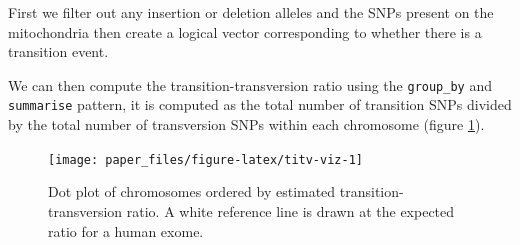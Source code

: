 \documentclass[10pt,letterpaper]{article}
\newenvironment{Shaded}{\begin{snugshade}}{\end{snugshade}}
\newcommand{\DataTypeTok}[1]{\textcolor[rgb]{0.13,0.29,0.53}{#1}}
\newcommand{\KeywordTok}[1]{\textcolor[rgb]{0.13,0.29,0.53}{\textbf{#1}}}
\newcommand{\NormalTok}[1]{#1}
\newcommand{\OperatorTok}[1]{\textcolor[rgb]{0.81,0.36,0.00}{\textbf{#1}}}
\newcommand{\StringTok}[1]{\textcolor[rgb]{0.31,0.60,0.02}{#1}}
\begin{document}
First we filter out any insertion or deletion alleles and the SNPs
present on the mitochondria then create a logical vector corresponding
to whether there is a transition event.

\begin{Shaded}
\end{Shaded}

We can then compute the transition-transversion ratio using the
\texttt{group\_by} and \texttt{summarise} pattern, it is computed as the
total number of transition SNPs divided by the total number of
transversion SNPs within each chromosome (figure \ref{fig:titv-viz}).

\begin{Shaded}
\end{Shaded}

\begin{figure}

{\centering \texttt{[image: paper\_files/figure-latex/titv-viz-1]} 

}

\caption{Dot plot of chromosomes ordered by estimated transition-transversion ratio. A white reference line is drawn at the expected ratio for a human exome.}\label{fig:titv-viz}
\end{figure}
\end{document}
